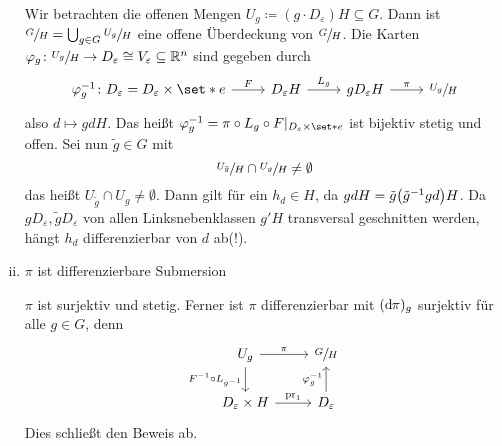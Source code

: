 \begin{beweis}
\begin{enumerate}[(i)]
		Wir betrachten die offenen Mengen $U_g \coloneqq (g \cdot D_\varepsilon)H \subseteq G$.
		Dann ist $\sfrac{G}{H} = \bigcup_{g \in G} \sfrac{U_g}{H}$ eine offene Überdeckung von $\sfrac{G}{H}$.
		Die Karten $\varphi_g \colon \sfrac{U_g}{H} \to D_\varepsilon \cong V_\varepsilon \subseteq \mathbb{R}^n$ sind gegeben durch 
		\[
			\begin{tikzcd}
				\varphi_g^{-1} \colon D_\varepsilon = D_\varepsilon \times \set*{e}  \rar["F"] & D_\varepsilon H \rar["L_g"] & g D_\varepsilon H \rar["\pi"] & \sfrac{U_g}{H}
			\end{tikzcd}
		\]
		also $d \mapsto gdH$.
		Das heißt $\varphi_g^{-1} = \pi \circ L_g \circ F|_{D_\varepsilon \times \set*{e}}$ ist bijektiv stetig und offen.
		Sei nun $\tilde{g} \in G$ mit
		\[
			\sfrac{U_{\tilde{g}}}{H} \cap \sfrac{U_g}{H} \neq \emptyset
		\]
		das heißt $U_{\tilde{g}} \cap U_{g} \neq \emptyset$.
		Dann gilt
		für ein $h_d \in H$, da $g d H = \tilde{g} \enbrace*{\tilde{g}^{-1} g d}H$.
		Da $g D_\varepsilon, \tilde{g}D_\varepsilon$ von allen Linksnebenklassen $g' H$ transversal geschnitten werden, hängt $h_d$ differenzierbar von $d$ ab(!).
		\item $\pi$ ist differenzierbare Submersion
		
		$\pi$ ist surjektiv und stetig. Ferner ist $\pi$ differenzierbar mit $(\mathrm{d}\mkern-1.0mu \pi)_g$ surjektiv für alle $g \in G$, denn
		\[
			\begin{tikzcd}
				U_g \dar["F^{-1} \circ L_{g^{-1}}"'] \rar["\pi"] & \sfrac{G}{H} \\
				D_\varepsilon \times H \rar["\pr_1"] & D_\varepsilon \uar["\varphi_g^{-1}"]
			\end{tikzcd}
		\]
		Dies schließt den Beweis ab.\qedhere
	\end{enumerate}
\end{beweis}

